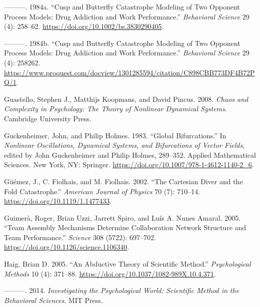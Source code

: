 \documentclass[
  a4paper,
  DIV=11,
  numbers=noendperiod,
  oneside]{scrreprt}
\newlength{\cslhangindent}
\newlength{\cslentryspacingunit} %
\newenvironment{CSLReferences}[2] %
 {%
  \setlength{\parindent}{0pt}
  \ifodd #1
  \let\oldpar\par
  \def\par{\hangindent=\cslhangindent\oldpar}
  \fi
  \setlength{\parskip}{#2\cslentryspacingunit}
 }%
 {}
\begin{document}
\begin{CSLReferences}{1}{0}
\leavevmode{}%
---------. 1984a. {``Cusp and Butterfly Catastrophe Modeling of Two
Opponent Process Models: {Drug} Addiction and Work Performance.''}
\emph{Behavioral Science} 29 (4): 258--62.
\url{https://doi.org/10.1002/bs.3830290405}.

\leavevmode{}%
---------. 1984b. {``Cusp and Butterfly Catastrophe Modeling of Two
Opponent Process Models: Drug Addiction and Work Performance.''}
\emph{Behavioral Science} 29 (4): 258262.
\url{https://www.proquest.com/docview/1301285594/citation/C898CBB773DF4B72PQ/1}.

\leavevmode{}%
Guastello, Stephen J., Matthijs Koopmans, and David Pincus. 2008.
\emph{Chaos and {Complexity} in {Psychology}: {The Theory} of {Nonlinear
Dynamical Systems}}. {Cambridge University Press}.

\leavevmode{}%
Guckenheimer, John, and Philip Holmes. 1983. {``Global
{Bifurcations}.''} In \emph{Nonlinear {Oscillations}, {Dynamical
Systems}, and {Bifurcations} of {Vector Fields}}, edited by John
Guckenheimer and Philip Holmes, 289--352. Applied {Mathematical
Sciences}. {New York, NY}: {Springer}.
\url{https://doi.org/10.1007/978-1-4612-1140-2_6}.

\leavevmode{}%
Güémez, J., C. Fiolhais, and M. Fiolhais. 2002. {``The {Cartesian} Diver
and the Fold Catastrophe.''} \emph{American Journal of Physics} 70 (7):
710--14. \url{https://doi.org/10.1119/1.1477433}.

\leavevmode{}%
Guimerà, Roger, Brian Uzzi, Jarrett Spiro, and Luís A. Nunes Amaral.
2005. {``Team {Assembly Mechanisms Determine Collaboration Network
Structure} and {Team Performance}.''} \emph{Science} 308 (5722):
697--702. \url{https://doi.org/10.1126/science.1106340}.

\leavevmode{}%
Haig, Brian D. 2005. {``An Abductive Theory of Scientific Method.''}
\emph{Psychological Methods} 10 (4): 371--88.
\url{https://doi.org/10.1037/1082-989X.10.4.371}.

\leavevmode{}%
---------. 2014. \emph{Investigating the {Psychological World}:
{Scientific Method} in the {Behavioral Sciences}}. {MIT Press}.


\end{CSLReferences}
\end{document}
